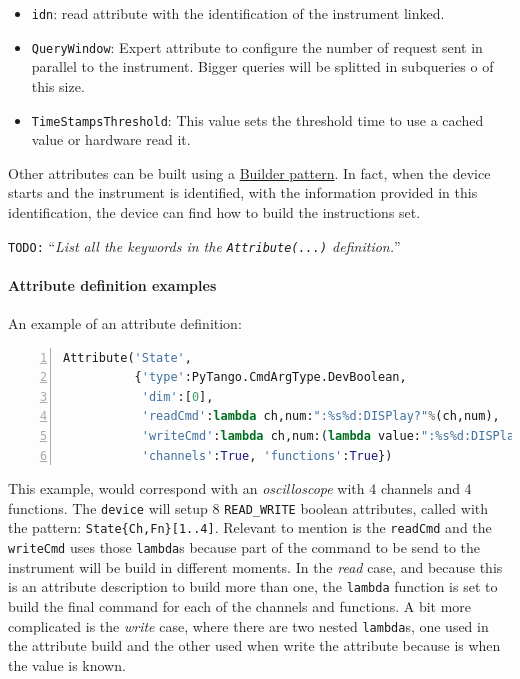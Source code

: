 \documentclass[a4paper,10pt]{article}
\newcommand{\todo}[1]{\texttt{\color{red}TODO:} ``\emph{#1}''}
\begin{document}
\begin{itemize}
    \item {\tt idn}: read attribute with the identification of the instrument linked.
    \item {\tt QueryWindow}: Expert attribute to configure the number of request sent in parallel to the instrument. Bigger queries will be splitted in subqueries o of this size.
    \item {\tt TimeStampsThreshold}: This value sets the threshold time to use a cached value or hardware read it.
\end{itemize}

Other attributes can be built using a \href{http://en.wikipedia.org/wiki/Builder_pattern}{Builder pattern}. In fact, when the device starts and the instrument is identified, with the information provided in this identification, the device can find how to build the instructions set.

\todo{List all the keywords in the \texttt{Attribute(...)} definition.}

\paragraph{Attribute definition examples}

An example of an attribute definition:

\begin{lstlisting}[language=python, basicstyle=\ttfamily\small\footnotesize, numbers=left]
Attribute('State',
          {'type':PyTango.CmdArgType.DevBoolean,
           'dim':[0],
           'readCmd':lambda ch,num:":%s%d:DISPlay?"%(ch,num),
           'writeCmd':lambda ch,num:(lambda value:":%s%d:DISPlay %s"%(ch,num,value)),
           'channels':True, 'functions':True})
\end{lstlisting}

This example, would correspond with an \emph{oscilloscope} with 4 channels and 4 functions. The \texttt{device} will setup 8 {\tt READ\_WRITE} boolean attributes, called with the pattern: {\tt State\{Ch,Fn\}[1..4]}. Relevant to mention is the {\tt readCmd} and the {\tt writeCmd} uses those {\tt lambda}s because part of the command to be send to the instrument will be build in different moments. In the \emph{read} case, and because this is an attribute description to build more than one, the {\tt lambda} function is set to build the final command for each of the channels and functions. A bit more complicated is the \emph{write} case, where there are two nested {\tt lambda}s, one used in the attribute build and the other used when write the attribute because is when the value is known.
\end{document}
